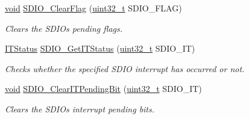 \begin{DoxyCompactItemize}
\hyperlink{usb__devapi_8h_afabf60e7f57651d6d595a02c75f07cd0}{void} \hyperlink{group___s_d_i_o___private___functions_ga7aff4efdeb528229135f9f285e53518a}{S\+D\+I\+O\+\_\+\+Clear\+Flag} (\hyperlink{_p_e___types_8h_a33594304e786b158f3fb30289278f5af}{uint32\+\_\+t} S\+D\+I\+O\+\_\+\+F\+L\+AG)
\begin{DoxyCompactList}\small\item\em Clears the S\+D\+IO\textquotesingle{}s pending flags. \end{DoxyCompactList}\item 
\hyperlink{agilefox_2library_2inc_2stm32f10x__type_8h_aacbd7ed539db0aacd973a0f6eca34074}{I\+T\+Status} \hyperlink{group___s_d_i_o___private___functions_ga2d64af1f3df0f99cb518f9a89bbd02ac}{S\+D\+I\+O\+\_\+\+Get\+I\+T\+Status} (\hyperlink{_p_e___types_8h_a33594304e786b158f3fb30289278f5af}{uint32\+\_\+t} S\+D\+I\+O\+\_\+\+IT)
\begin{DoxyCompactList}\small\item\em Checks whether the specified S\+D\+IO interrupt has occurred or not. \end{DoxyCompactList}\item 
\hyperlink{usb__devapi_8h_afabf60e7f57651d6d595a02c75f07cd0}{void} \hyperlink{group___s_d_i_o___private___functions_ga048e07fd86321cd01b2a22c071c3149b}{S\+D\+I\+O\+\_\+\+Clear\+I\+T\+Pending\+Bit} (\hyperlink{_p_e___types_8h_a33594304e786b158f3fb30289278f5af}{uint32\+\_\+t} S\+D\+I\+O\+\_\+\+IT)
\begin{DoxyCompactList}\small\item\em Clears the S\+D\+IO\textquotesingle{}s interrupt pending bits. \end{DoxyCompactList}\end{DoxyCompactItemize}
